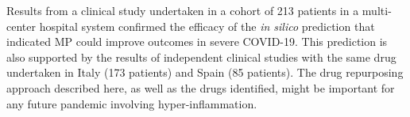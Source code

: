 \documentclass[Minh_PhD_thesis.tex]{subfiles}
\begin{document}

Results from a clinical study undertaken in a cohort of 213 patients in a multi-center hospital system confirmed the efficacy of the \emph{in silico} prediction that indicated MP could improve outcomes in severe COVID-19. 
This prediction is also supported by the results of independent clinical studies with the same drug undertaken in Italy (173 patients) and Spain (85 patients). The drug repurposing approach described here, as well as the drugs identified, might be important for any future pandemic involving hyper-inflammation.
\end{document}
